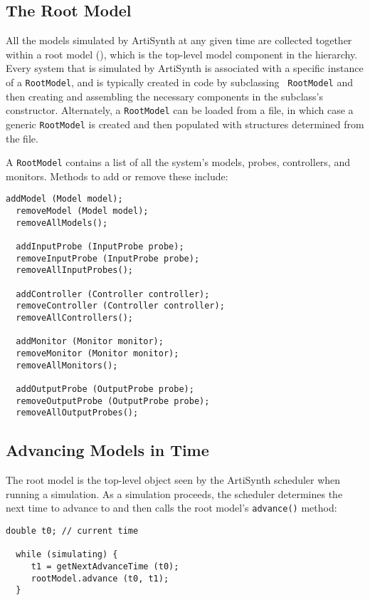 \documentclass{article}
\begin{document}
\subsection{The Root Model}
\label{RootModelSec}

All the models simulated by ArtiSynth at any given time are collected
together within a root model
(), which is the
top-level model component in the hierarchy. Every system that is
simulated by ArtiSynth is associated with a specific instance of a
{\tt RootModel}, and is typically created in code by subclassing {\tt
RootModel} and then creating and assembling the necessary components
in the subclass's constructor. Alternately, a {\tt RootModel} can be
loaded from a file, in which case a generic {\tt RootModel} is created
and then populated with structures determined from the file.

A {\tt RootModel} contains a list of all the system's models, probes,
controllers, and monitors. Methods to add or remove these include:

\begin{lstlisting}[]
  addModel (Model model);
  removeModel (Model model);
  removeAllModels();

  addInputProbe (InputProbe probe);
  removeInputProbe (InputProbe probe);
  removeAllInputProbes();

  addController (Controller controller);
  removeController (Controller controller);
  removeAllControllers();

  addMonitor (Monitor monitor);
  removeMonitor (Monitor monitor);
  removeAllMonitors();

  addOutputProbe (OutputProbe probe);
  removeOutputProbe (OutputProbe probe);
  removeAllOutputProbes();
\end{lstlisting}

\subsection{Advancing Models in Time}

The root model is the top-level object seen by the ArtiSynth scheduler
when running a simulation. As a simulation proceeds, the scheduler determines
the next time to advance to and then calls the root model's {\tt advance()}
method:
\begin{lstlisting}[]
  double t0; // current time

  while (simulating) {
     t1 = getNextAdvanceTime (t0);
     rootModel.advance (t0, t1);
  }
\end{lstlisting}
\end{document}
